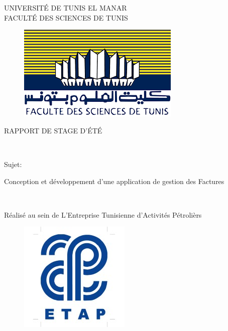 \documentclass[12pt]{report}
\begin{document}
 \thispagestyle{empty}
\begin{center}
UNIVERSITÉ DE TUNIS EL MANAR\\[15pt]
FACULTÉ DES SCIENCES DE TUNIS

\vspace{20PT}
\begin{figure}[H]
  \centering
  \includegraphics[scale=0.5]{fst}
\end{figure}
\vspace{20PT}
\begin{huge}
RAPPORT DE STAGE D'ÉTÉ
\end{huge}
\\
\vspace{30pt}
\begin{Large}
Sujet:\\
\end{Large}

\vspace{30pt}
\begin{Huge}
Conception et développement d'une application de gestion des Factures 
\end{Huge}
\\
\vspace{50pt}
\begin{Large}
Réalisé au sein de L'Entreprise Tunisienne d'Activités Pétrolièrs
\end{Large}
\end{center}
\begin{figure}[H]
  \centering
  \includegraphics[scale=0.5]{etap}
  \label{fig:votre-label}
\end{figure}
\end{document}
